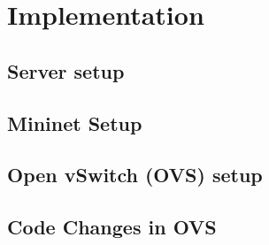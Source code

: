\chapter{Implementation}
\section{Server setup}
\section{Mininet Setup}
\section{Open vSwitch (OVS) setup}
\section{Code Changes in OVS}


